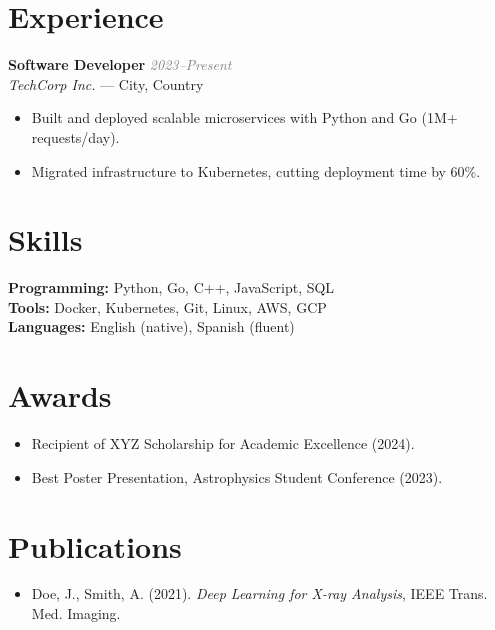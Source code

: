 \documentclass[a4paper,11pt]{article}
\newcommand{\dated}[1]{\textcolor{gray}{\textit{#1}}}
\newcommand{\resumeSubheading}[4]{
  \vspace{1pt}\textbf{#1} \hfill \dated{#2} \\
  \textit{#3} --- #4 \vspace{2pt}
}
\newenvironment{resumeItemList}{\begin{itemize}[leftmargin=*]}{\end{itemize}}
\begin{document}
\section{Experience}
\resumeSubheading{Software Developer}{2023--Present}{TechCorp Inc.}{City, Country}
\begin{resumeItemList}
  \item Built and deployed scalable microservices with Python and Go (1M+ requests/day).
  \item Migrated infrastructure to Kubernetes, cutting deployment time by 60\%.
\end{resumeItemList}

\section{Skills}
\textbf{Programming:} Python, Go, C++, JavaScript, SQL \\
\textbf{Tools:} Docker, Kubernetes, Git, Linux, AWS, GCP \\
\textbf{Languages:} English (native), Spanish (fluent) \\

\section{Awards}
\begin{resumeItemList}
  \item Recipient of XYZ Scholarship for Academic Excellence (2024).
  \item Best Poster Presentation, Astrophysics Student Conference (2023).
\end{resumeItemList}

\section{Publications}
\begin{resumeItemList}
  \item Doe, J., Smith, A. (2021). \emph{Deep Learning for X-ray Analysis}, IEEE Trans. Med. Imaging.
\end{resumeItemList}

\end{document}
